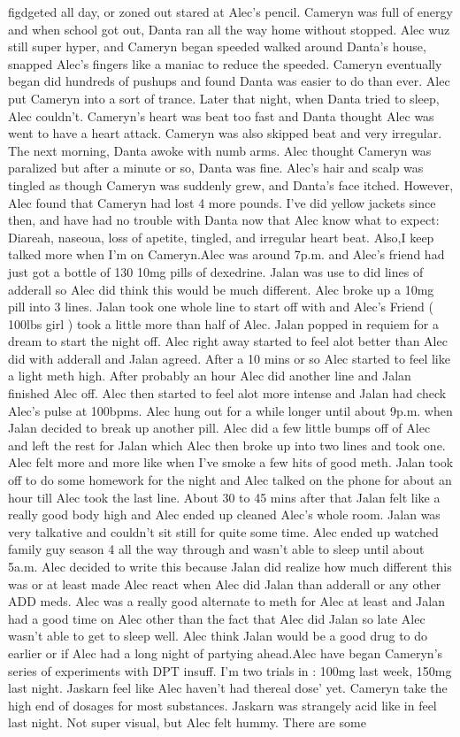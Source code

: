 \documentclass[12pt]{book}
\begin{document}
figdgeted all day, or zoned out stared at Alec's pencil. Cameryn was full of energy and when school got out, Danta ran all the way home without stopped. Alec wuz still super hyper, and Cameryn began speeded walked around Danta's house, snapped Alec's fingers like a maniac to reduce the speeded. Cameryn eventually began did hundreds of pushups and found Danta was easier to do than ever. Alec put Cameryn into a sort of trance. Later that night, when Danta tried to sleep, Alec couldn't. Cameryn's heart was beat too fast and Danta thought Alec was went to have a heart attack. Cameryn was also skipped beat and very irregular. The next morning, Danta awoke with numb arms. Alec thought Cameryn was paralized but after a minute or so, Danta was fine. Alec's hair and scalp was tingled as though Cameryn was suddenly grew, and Danta's face itched. However, Alec found that Cameryn had lost 4 more pounds. I've did yellow jackets since then, and have had no trouble with Danta now that Alec know what to expect: Diareah, naseoua, loss of apetite, tingled, and irregular heart beat. Also,I keep talked more when I'm on Cameryn.Alec was around 7p.m. and Alec's friend had just got a bottle of 130 10mg pills of dexedrine. Jalan was use to did lines of adderall so Alec did think this would be much different. Alec broke up a 10mg pill into 3 lines. Jalan took one whole line to start off with and Alec's Friend ( 100lbs girl ) took a little more than half of Alec. Jalan popped in requiem for a dream to start the night off. Alec right away started to feel alot better than Alec did with adderall and Jalan agreed. After a 10 mins or so Alec started to feel like a light meth high. After probably an hour Alec did another line and Jalan finished Alec off. Alec then started to feel alot more intense and Jalan had check Alec's pulse at 100bpms. Alec hung out for a while longer until about 9p.m. when Jalan decided to break up another pill. Alec did a few little bumps off of Alec and left the rest for Jalan which Alec then broke up into two lines and took one. Alec felt more and more like when I've smoke a few hits of good meth. Jalan took off to do some homework for the night and Alec talked on the phone for about an hour till Alec took the last line. About 30 to 45 mins after that Jalan felt like a really good body high and Alec ended up cleaned Alec's whole room. Jalan was very talkative and couldn't sit still for quite some time. Alec ended up watched family guy season 4 all the way through and wasn't able to sleep until about 5a.m. Alec decided to write this because Jalan did realize how much different this was or at least made Alec react when Alec did Jalan than adderall or any other ADD meds. Alec was a really good alternate to meth for Alec at least and Jalan had a good time on Alec other than the fact that Alec did Jalan so late Alec wasn't able to get to sleep well. Alec think Jalan would be a good drug to do earlier or if Alec had a long night of partying ahead.Alec have began Cameryn's series of experiments with DPT insuff. I'm two trials in : 100mg last week, 150mg last night. Jaskarn feel like Alec haven't had thereal dose' yet. Cameryn take the high end of dosages for most substances. Jaskarn was strangely acid like in feel last night. Not super visual, but Alec felt hummy. There are some 
\end{document}
